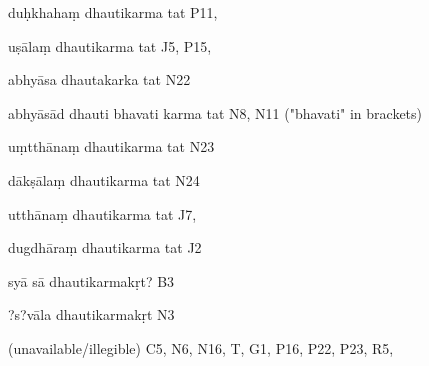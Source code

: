\begin{ekdosis}
\begin{marma}[hp01_055]
\begin{marma}[hp02_009]
\begin{marma}[hp02_011]
\begin{marma}[hp02_24d]
\item[duḥkhahaṃ dhautikarma tat] P11, 
\item[uṣālaṃ dhautikarma tat] J5, P15, 
\item[abhyāsa dhautakarka tat] N22
\item[abhyāsād dhauti bhavati karma tat] N8, N11 ("bhavati" in brackets)
\item[uṃtthānaṃ dhautikarma tat] N23
\item[dākṣālaṃ dhautikarma tat] N24
\item[utthānaṃ dhautikarma tat] J7,
\item[dugdhāraṃ dhautikarma tat] J2
\item[syā sā dhautikarmakṛt?] B3
\item[?s?vāla dhautikarmakṛt] N3
\item[(unavailable/illegible)] C5, N6, N16, T, G1, P16, P22, P23, R5,
  \begin{description}

    \end{description}
 \end{marma}


\end{marma}
\end{marma}
\end{marma}
\end{ekdosis}
